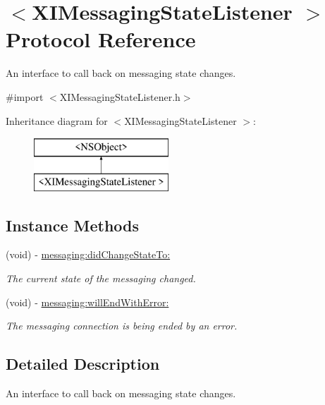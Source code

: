 \hypertarget{protocol_x_i_messaging_state_listener_01-p}{}\section{$<$X\+I\+Messaging\+State\+Listener $>$ Protocol Reference}
\label{protocol_x_i_messaging_state_listener_01-p}


An interface to call back on messaging state changes.  




{\ttfamily \#import $<$X\+I\+Messaging\+State\+Listener.\+h$>$}

Inheritance diagram for $<$X\+I\+Messaging\+State\+Listener $>$\+:\begin{figure}[H]
\begin{center}
\leavevmode
\includegraphics[height=2.000000cm]{protocol_x_i_messaging_state_listener_01-p}
\end{center}
\end{figure}
\subsection*{Instance Methods}
\begin{DoxyCompactItemize}
\item 
(void) -\/ \hyperlink{protocol_x_i_messaging_state_listener_01-p_a9eb7b05e86af332ad9ce6b78f6ffdc46}{messaging\+:did\+Change\+State\+To\+:}
\begin{DoxyCompactList}\small\item\em The current state of the messaging changed. \end{DoxyCompactList}\item 
(void) -\/ \hyperlink{protocol_x_i_messaging_state_listener_01-p_af095a64858599a26d65e266346acbbae}{messaging\+:will\+End\+With\+Error\+:}
\begin{DoxyCompactList}\small\item\em The messaging connection is being ended by an error. \end{DoxyCompactList}\end{DoxyCompactItemize}


\subsection{Detailed Description}
An interface to call back on messaging state changes. 


